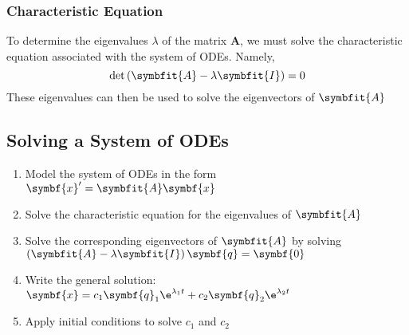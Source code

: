 \documentclass{article}
\begin{document}
\subsubsection{Characteristic Equation}
To determine the eigenvalues \(\lambda \) of the matrix \(\symbf{A}\), we must solve the characteristic equation
associated with the system of ODEs. Namely,
\begin{equation*}
    \det{\left( \symbfit{A} - \lambda\symbfit{I} \right)} = 0
\end{equation*}
These eigenvalues can then be used to solve the eigenvectors of \(\symbfit{A}\)
\subsection{Solving a System of ODEs}
\begin{enumerate}
    \item Model the system of ODEs in the form \(\symbf{x}' = \symbfit{A} \symbf{x}\)
    \item Solve the characteristic equation for the eigenvalues of \(\symbfit{A}\)
    \item Solve the corresponding eigenvectors of \(\symbfit{A}\) by solving \(\left( \symbfit{A} - \lambda\symbfit{I} \right) \symbf{q} = \symbf{0}\)
    \item Write the general solution: \(\symbf{x} = c_1\symbf{q}_1\e^{\lambda_1 t} + c_2\symbf{q}_2\e^{\lambda_2 t}\)
    \item Apply initial conditions to solve \(c_1\) and \(c_2\)
\end{enumerate}
\end{document}
